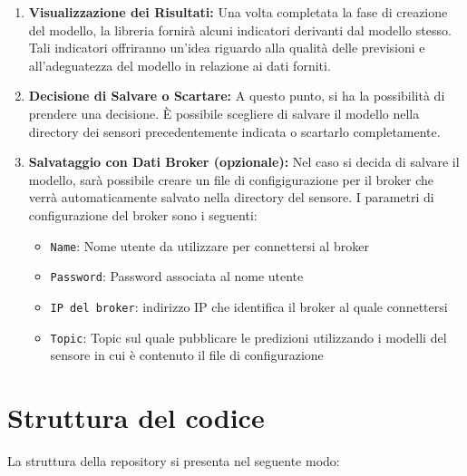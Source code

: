\documentclass{rapportECL}
\begin{document}
\begin{enumerate}
  \item \textbf{Visualizzazione dei Risultati:} Una volta completata la fase di creazione del modello, la libreria fornirà alcuni indicatori derivanti dal modello stesso. 
  Tali indicatori offriranno un'idea riguardo alla qualità delle previsioni e all'adeguatezza del modello in relazione ai dati forniti.

  \item \textbf{Decisione di Salvare o Scartare:} A questo punto, si ha la possibilità di prendere una decisione. 
  È possibile scegliere di salvare il modello nella directory dei sensori precedentemente indicata o scartarlo completamente.
  
  \item \textbf{Salvataggio con Dati Broker (opzionale):} Nel caso si decida di salvare il modello, sarà possibile creare un file di configigurazione 
  per il broker che verrà automaticamente salvato nella directory del sensore.  I parametri di configurazione del broker sono i seguenti:
  
  \begin{itemize}
    \item \texttt{Name}: Nome utente da utilizzare per connettersi al broker
    \item \texttt{Password}: Password associata al nome utente
    \item \texttt{IP del broker}: indirizzo IP che identifica il broker al quale connettersi
    \item \texttt{Topic}: Topic sul quale pubblicare le predizioni utilizzando i modelli del sensore in cui è contenuto il file di configurazione
  \end{itemize}
\end{enumerate}

\chapter{Struttura del codice}
La struttura della repository si presenta nel seguente modo:

\end{document}

